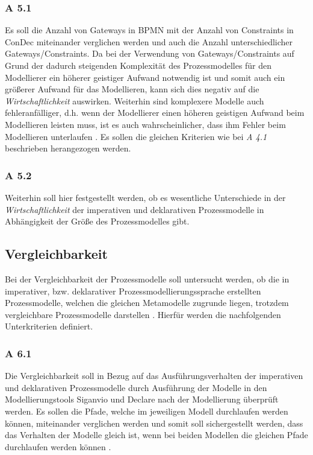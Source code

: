 \subsubsection{A 5.1}
Es soll die Anzahl von Gateways in BPMN mit der Anzahl von Constraints in ConDec miteinander verglichen werden und auch die Anzahl unterschiedlicher Gateways/Constraints. Da bei der Verwendung von Gateways/Constraints auf Grund der dadurch steigenden Komplexität des Prozessmodelles für den Modellierer ein höherer geistiger Aufwand notwendig ist und somit auch ein größerer Aufwand für das Modellieren, kann sich dies negativ auf die \textit{Wirtschaftlichkeit} auswirken. Weiterhin sind komplexere Modelle auch fehleranfälliger, d.h. wenn der Modellierer einen höheren geistigen Aufwand beim Modellieren leisten muss, ist es auch wahrscheinlicher, dass ihm Fehler beim Modellieren unterlaufen \cite{freund2007, journals95, leimeister2012,mendling2010seven}.
Es sollen die gleichen Kriterien wie bei \textit{A 4.1} beschrieben herangezogen werden.

\subsubsection{A 5.2}
Weiterhin soll hier festgestellt werden, ob es wesentliche Unterschiede in der \textit{Wirtschaftlichkeit} der imperativen und deklarativen Prozessmodelle in Abhängigkeit der Größe des Prozessmodelles gibt. 

\subsection{Vergleichbarkeit}
Bei der Vergleichbarkeit der Prozessmodelle soll untersucht werden, ob die in imperativer, bzw. deklarativer Prozessmodellierungssprache erstellten Prozessmodelle, welchen die gleichen Metamodelle zugrunde liegen, trotzdem vergleichbare Prozessmodelle darstellen \cite{freund2007, journals95, leimeister2012}. Hierfür werden die nachfolgenden Unterkriterien definiert.

\subsubsection{A 6.1}
Die Vergleichbarkeit soll in Bezug auf das Ausführungsverhalten der imperativen und deklarativen Prozessmodelle durch Ausführung der Modelle in den Modellierungstools Siganvio und Declare nach der Modellierung überprüft werden. Es sollen die Pfade, welche im jeweiligen Modell durchlaufen werden können, miteinander verglichen werden und somit soll sichergestellt werden, dass das Verhalten der Modelle gleich ist, wenn bei beiden Modellen die gleichen Pfade durchlaufen werden können \cite{haisjackl2014understanding}.

